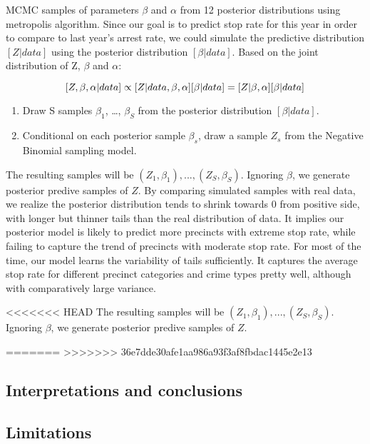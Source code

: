 \documentclass[]{article}
\providecommand{\tightlist}{%
  \setlength{\itemsep}{0pt}\setlength{\parskip}{0pt}}
\begin{document}
MCMC samples of parameters \(\beta\) and \(\alpha\) from 12 posterior
distributions using metropolis algorithm. Since our goal is to predict
stop rate for this year in order to compare to last year's arrest rate,
we could simulate the predictive distribution \([Z|data]\) using the
posterior distribution \([\beta|data]\). Based on the joint distribution
of Z, \(\beta\) and \(\alpha\):

\[
[Z, \beta, \alpha|data] \propto [Z|data, \beta, \alpha][\beta|data]\\
=[Z|\beta, \alpha][\beta|data]
\]

\begin{enumerate}
\def\labelenumi{\arabic{enumi}.}
\tightlist
\item
  Draw S samples \(\beta_1\), \ldots{}, \(\beta_S\) from the posterior
  distribution \([\beta|data]\).
\item
  Conditional on each posterior sample \(\beta_s\), draw a sample
  \(Z_s\) from the Negative Binomial sampling model.
\end{enumerate}

The resulting samples will be \((Z_1, \beta_1), ..., (Z_S, \beta_S)\).
Ignoring \(\beta\), we generate posterior predive samples of \(Z\). By
comparing simulated samples with real data, we realize the posterior
distribution tends to shrink towards 0 from positive side, with longer
but thinner tails than the real distribution of data. It implies our
posterior model is likely to predict more precincts with extreme stop
rate, while failing to capture the trend of precincts with moderate stop
rate. For most of the time, our model learns the variability of tails
sufficiently. It captures the average stop rate for different precinct
categories and crime types pretty well, although with comparatively
large variance.

<<<<<<< HEAD
The resulting samples will be \((Z_1, \beta_1), ..., (Z_S, \beta_S)\).
Ignoring \(\beta\), we generate posterior predive samples of \(Z\).

=======
>>>>>>> 36e7dde30afe1aa986a93f3af8fbdac1445e2e13
\hypertarget{interpretations-and-conclusions}{%
\subsection{Interpretations and
conclusions}\label{interpretations-and-conclusions}}

\hypertarget{limitations}{%
\subsection{Limitations}\label{limitations}}
\end{document}
